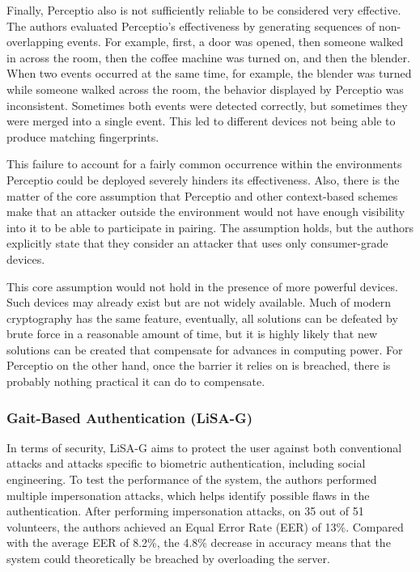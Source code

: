 \documentclass[10pt,twocolumn,letterpaper]{article}
\begin{document}
Finally, Perceptio also is not sufficiently reliable to be considered very effective. The authors evaluated Perceptio’s effectiveness by generating sequences of non-overlapping events. For example, first, a door was opened, then someone walked in across the room, then the coffee machine was turned on, and then the blender. When two events occurred at the same time, for example, the blender was turned while someone walked across the room, the behavior displayed by Perceptio was inconsistent. Sometimes both events were detected correctly, but sometimes they were merged into a single event. This led to different devices not being able to produce matching fingerprints. 

This failure to account for a fairly common occurrence within the environments Perceptio could be deployed severely hinders its effectiveness. Also, there is the matter of the core assumption that Perceptio and other context-based schemes make that an attacker outside the environment would not have enough visibility into it to be able to participate in pairing. The assumption holds, but the authors explicitly state that they consider an attacker that uses only consumer-grade devices. 

This core assumption would not hold in the presence of more powerful devices. Such devices may already exist but are not widely available. Much of modern cryptography has the same feature, eventually, all solutions can be defeated by brute force in a reasonable amount of time, but it is highly likely that new solutions can be created that compensate for advances in computing power. For Perceptio on the other hand, once the barrier it relies on is breached, there is probably nothing practical it can do to compensate.


\subsubsection{Gait-Based Authentication (LiSA-G)}
In terms of security, LiSA-G aims to protect the user against both conventional attacks and attacks specific to biometric authentication, including social engineering. To test the performance of the system, the authors performed multiple impersonation attacks, which helps identify possible flaws in the authentication. After performing impersonation attacks,  on 35 out of 51 volunteers, the authors achieved an Equal Error Rate (EER) of 13\%. Compared with the average EER of 8.2\%, the 4.8\% decrease in accuracy means that the system could theoretically be breached by overloading the server.
\end{document}
